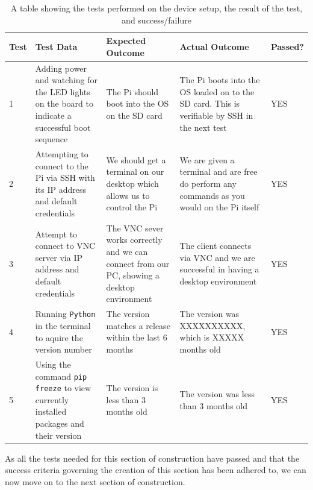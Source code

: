 \documentclass[9pt]{article}
\begin{document}
\begin{table}[H]
	\centering
	\begin{tabularx}{\textwidth}{lXXXl}
		\textbf{Test} & \textbf{Test Data}                                                                               & \textbf{Expected Outcome}                                                 & \textbf{Actual Outcome}                                                                       & \textbf{Passed?} \\ \midrule
		1             & Adding power and watching for the LED lights on the board to indicate a successful boot sequence & The Pi should boot into the OS on the SD card                             & The Pi boots into the OS loaded on to the SD card. This is verifiable by SSH in the next test & YES              \\
		2             & Attempting to connect to the Pi via SSH with its IP address and default credentials            & We should get a terminal on our desktop which allows us to control the Pi & We are given a terminal and are free do perform any commands as you would on the Pi itself    & YES              \\
		3             & Attempt to connect to VNC server via IP address and default credentials & The VNC sever works correctly and we can connect from our PC, showing a desktop environment
& The client connects via VNC and we are successful in having a desktop environment & YES \\
		4             & Running \texttt{Python} in the terminal to aquire the version number & The version matches a release within the last 6 months & The version was XXXXXXXXXX, which is XXXXX months old & YES \\
		5             & Using the command \texttt{pip freeze} to view currently installed packages and their version & The version is less than 3 months old & The version was less than 3 months old & YES \\ \bottomrule
	\end{tabularx}
	\caption{A table showing the tests performed on the device setup, the result of the test, and success/failure}
	\label{tab_deviceSetupTesting}
\end{table}
As all the tests needed for this section of construction have passed and that the success criteria governing the creation of this section has been adhered to, we can now move on to the next section of construction.
\end{document}
